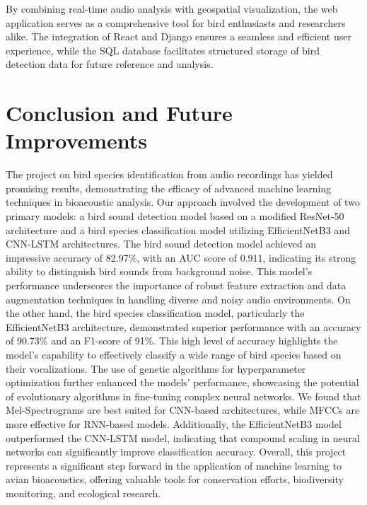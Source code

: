 By combining real-time audio analysis with geospatial visualization, the web application serves as a comprehensive tool for bird enthusiasts and researchers alike. The integration of React and Django ensures a seamless and efficient user experience, while the SQL database facilitates structured storage of bird detection data for future reference and analysis.


\chapter{Conclusion and Future Improvements}
The project on bird species identification from audio recordings has yielded promising results, demonstrating the efficacy of advanced machine learning techniques in bioacoustic analysis. Our approach involved the development of two primary models: a bird sound detection model based on a modified ResNet-50 architecture and a bird species classification model utilizing EfficientNetB3 and CNN-LSTM architectures. The bird sound detection model achieved an impressive accuracy of 82.97\%, with an AUC score of 0.911, indicating its strong ability to distinguish bird sounds from background noise. This model's performance underscores the importance of robust feature extraction and data augmentation techniques in handling diverse and noisy audio environments. On the other hand, the bird species classification model, particularly the EfficientNetB3 architecture, demonstrated superior performance with an accuracy of 90.73\% and an F1-score of 91\%. This high level of accuracy highlights the model's capability to effectively classify a wide range of bird species based on their vocalizations. The use of genetic algorithms for hyperparameter optimization further enhanced the models' performance, showcasing the potential of evolutionary algorithms in fine-tuning complex neural networks. We found that Mel-Spectrograms are best suited for CNN-based architectures, while MFCCs are more effective for RNN-based models. Additionally, the EfficientNetB3 model outperformed the CNN-LSTM model, indicating that compound scaling in neural networks can significantly improve classification accuracy. Overall, this project represents a significant step forward in the application of machine learning to avian bioacoustics, offering valuable tools for conservation efforts, biodiversity monitoring, and ecological research.

